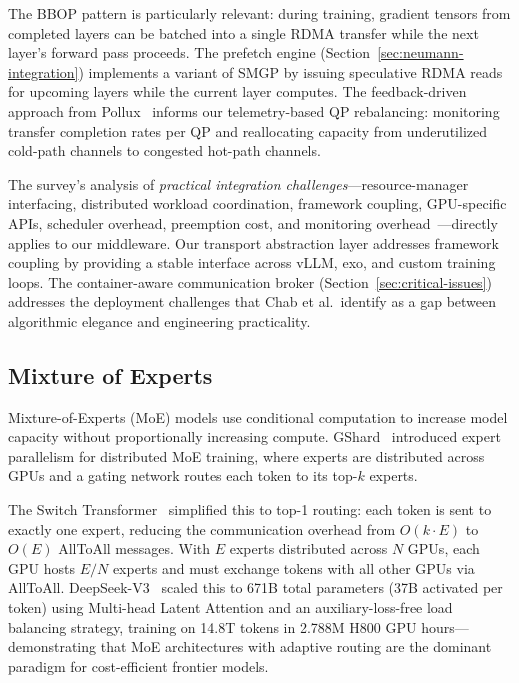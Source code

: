 \documentclass[11pt,letterpaper]{article}
\theoremstyle{definition}
\begin{document}
The BBOP pattern is particularly relevant: during training, gradient tensors from completed layers can be batched into a single RDMA transfer while the next layer's forward pass proceeds. The prefetch engine (Section~\ref{sec:neumann-integration}) implements a variant of SMGP by issuing speculative RDMA reads for upcoming layers while the current layer computes. The feedback-driven approach from Pollux~\cite{pollux2021} informs our telemetry-based QP rebalancing: monitoring transfer completion rates per QP and reallocating capacity from underutilized cold-path channels to congested hot-path channels.

The survey's analysis of \emph{practical integration challenges}---resource-manager interfacing, distributed workload coordination, framework coupling, GPU-specific APIs, scheduler overhead, preemption cost, and monitoring overhead~\cite{gpu-scheduling-survey}---directly applies to our middleware. Our transport abstraction layer addresses framework coupling by providing a stable interface across vLLM, exo, and custom training loops. The container-aware communication broker (Section~\ref{sec:critical-issues}) addresses the deployment challenges that Chab et al.\ identify as a gap between algorithmic elegance and engineering practicality.

\subsection{Mixture of Experts}

Mixture-of-Experts (MoE) models use conditional computation to increase model capacity without proportionally increasing compute. GShard~\cite{lepikhin2020gshard} introduced expert parallelism for distributed MoE training, where experts are distributed across GPUs and a gating network routes each token to its top-$k$ experts.

The Switch Transformer~\cite{fedus2021switch} simplified this to top-1 routing: each token is sent to exactly one expert, reducing the communication overhead from $O(k \cdot E)$ to $O(E)$ AllToAll messages. With $E$ experts distributed across $N$ GPUs, each GPU hosts $E/N$ experts and must exchange tokens with all other GPUs via AllToAll. DeepSeek-V3~\cite{deepseekv3} scaled this to 671B total parameters (37B activated per token) using Multi-head Latent Attention and an auxiliary-loss-free load balancing strategy, training on 14.8T tokens in 2.788M H800 GPU hours---demonstrating that MoE architectures with adaptive routing are the dominant paradigm for cost-efficient frontier models.
\end{document}

